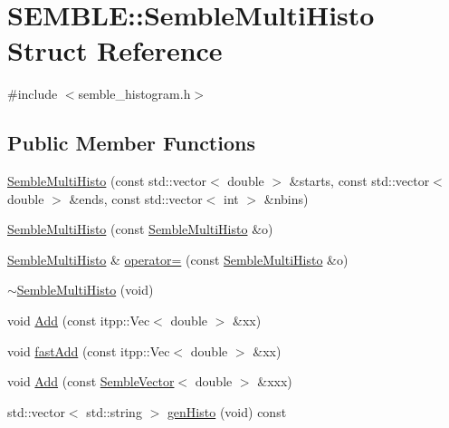 \hypertarget{structSEMBLE_1_1SembleMultiHisto}{}\section{S\+E\+M\+B\+LE\+:\+:Semble\+Multi\+Histo Struct Reference}
\label{structSEMBLE_1_1SembleMultiHisto}


{\ttfamily \#include $<$semble\+\_\+histogram.\+h$>$}

\subsection*{Public Member Functions}
\begin{DoxyCompactItemize}
\item 
\mbox{\hyperlink{structSEMBLE_1_1SembleMultiHisto_a3af7e8644faef45ba4935e8358785b1c}{Semble\+Multi\+Histo}} (const std\+::vector$<$ double $>$ \&starts, const std\+::vector$<$ double $>$ \&ends, const std\+::vector$<$ int $>$ \&nbins)
\item 
\mbox{\hyperlink{structSEMBLE_1_1SembleMultiHisto_ac8c7e221a826f9ce9c7f85764651e05b}{Semble\+Multi\+Histo}} (const \mbox{\hyperlink{structSEMBLE_1_1SembleMultiHisto}{Semble\+Multi\+Histo}} \&o)
\item 
\mbox{\hyperlink{structSEMBLE_1_1SembleMultiHisto}{Semble\+Multi\+Histo}} \& \mbox{\hyperlink{structSEMBLE_1_1SembleMultiHisto_a65872e3b0a77cb83cdd5e895caaeaf88}{operator=}} (const \mbox{\hyperlink{structSEMBLE_1_1SembleMultiHisto}{Semble\+Multi\+Histo}} \&o)
\item 
\mbox{\hyperlink{structSEMBLE_1_1SembleMultiHisto_ad20ae462e00c5340d2fad66630e7bb64}{$\sim$\+Semble\+Multi\+Histo}} (void)
\item 
void \mbox{\hyperlink{structSEMBLE_1_1SembleMultiHisto_a45e4394dec6ca6da040f45088e9484fe}{Add}} (const itpp\+::\+Vec$<$ double $>$ \&xx)
\item 
void \mbox{\hyperlink{structSEMBLE_1_1SembleMultiHisto_a8920593b2e66684dda381c02d586197c}{fast\+Add}} (const itpp\+::\+Vec$<$ double $>$ \&xx)
\item 
void \mbox{\hyperlink{structSEMBLE_1_1SembleMultiHisto_ac3f1fb8049db01afbfb7152bc98f7db3}{Add}} (const \mbox{\hyperlink{structSEMBLE_1_1SembleVector}{Semble\+Vector}}$<$ double $>$ \&xxx)
\item 
std\+::vector$<$ std\+::string $>$ \mbox{\hyperlink{structSEMBLE_1_1SembleMultiHisto_a1c6b72fa6f437d2e671ba4158e96e0a5}{gen\+Histo}} (void) const
\item 

\end{DoxyCompactItemize}
